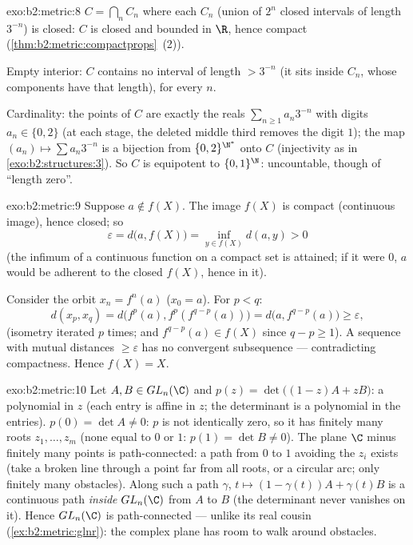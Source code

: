 \begin{solution}{exo:b2:metric:8}
$C = \bigcap_n C_n$ where each $C_n$ (union of $2^n$ closed
intervals of length $3^{-n}$) is closed: $C$ is closed and bounded
in $\R$, hence compact (\cref{thm:b2:metric:compactprops}~(2)).

Empty interior: $C$ contains no interval of length $> 3^{-n}$ (it
sits inside $C_n$, whose components have that length), for every
$n$.

Cardinality: the points of $C$ are exactly the reals $\sum_{n\geq1}
a_n 3^{-n}$ with digits $a_n \in \{0, 2\}$ (at each stage, the
deleted middle third removes the digit $1$); the map $(a_n) \mapsto
\sum a_n 3^{-n}$ is a bijection from $\{0,2\}^{\N^*}$ onto $C$
(injectivity as in \cref{exo:b2:structures:3}). So $C$ is equipotent
to $\{0,1\}^{\N}$: uncountable, though of ``length zero''.
\end{solution}

\begin{solution}{exo:b2:metric:9}
Suppose $a \notin f(X)$. The image $f(X)$ is compact (continuous
image), hence closed; so
\[
\varepsilon = d\bigl(a, f(X)\bigr)
= \inf_{y \in f(X)} d(a, y) > 0
\]
(the infimum of a continuous function on a compact set is attained;
if it were $0$, $a$ would be adherent to the closed $f(X)$, hence in
it).

Consider the orbit $x_n = f^n(a)$ ($x_0 = a$). For $p < q$:
\[
d(x_p, x_q) = d\bigl(f^p(a), f^p(f^{q-p}(a))\bigr)
= d\bigl(a, f^{q-p}(a)\bigr) \geq \varepsilon,
\]
(isometry iterated $p$ times; and $f^{q-p}(a) \in f(X)$ since $q - p
\geq 1$). A sequence with mutual distances $\geq \varepsilon$ has no
convergent subsequence --- contradicting compactness. Hence $f(X) =
X$.
\end{solution}

\begin{solution}{exo:b2:metric:10}
Let $A, B \in GL_n(\C)$ and $p(z) = \det\bigl((1-z)A + zB\bigr)$: a
polynomial in $z$ (each entry is affine in $z$; the determinant is a
polynomial in the entries). $p(0) = \det A \neq 0$: $p$ is not
identically zero, so it has finitely many roots $z_1, \dots, z_m$
(none equal to $0$ or $1$: $p(1) = \det B \neq 0$). The plane $\C$
minus finitely many points is path-connected: a path from $0$ to $1$
avoiding the $z_i$ exists (take a broken line through a point far
from all roots, or a circular arc; only finitely many obstacles).
Along such a path $\gamma$, $t \mapsto (1 - \gamma(t))A +
\gamma(t)B$ is a continuous path \emph{inside} $GL_n(\C)$ from $A$
to $B$ (the determinant never vanishes on it). Hence $GL_n(\C)$ is
path-connected --- unlike its real cousin
(\cref{ex:b2:metric:glnr}): the complex plane has room to walk
around obstacles.
\end{solution}


